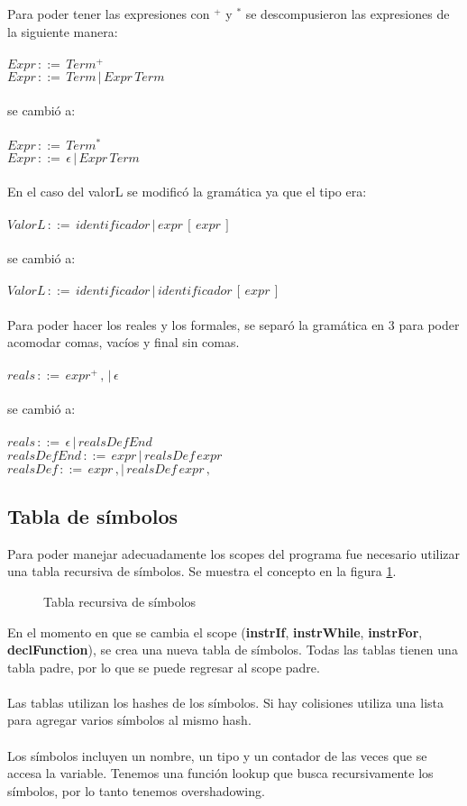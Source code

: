 \documentclass[11pt]{article}
\begin{document}
Para poder tener las expresiones con $^+$ y $^*$ se descompusieron las expresiones de la siguiente manera:
\\\\
$Expr\,::=\,Term^+$
\\
$Expr\,::=\,Term\,|\,Expr\,Term$
\\\\
se cambió a:
\\\\
$Expr\,::=\,Term^*$
\\
$Expr\,::=\,\epsilon\,|\,Expr\,Term$
\\\\
En el caso del valorL se modificó la gramática ya que el tipo era:
\\\\
$ValorL\,::=\,identificador\,|\,expr\,[\,expr\,]$
\\\\
se cambió a:
\\\\
$ValorL\,::=\,identificador\,|\,identificador\,[\,expr\,]$
\\\\
Para poder hacer los reales y los formales, se separó la gramática en 3 para poder acomodar comas, vacíos y final sin comas.
\\\\
$reals\,::=\,expr^+\,,\,|\,\epsilon$
\\\\
se cambió a:
\\\\
$reals\,::=\,\epsilon\,|\,realsDefEnd$
\\
$realsDefEnd\,::=\,expr\,|\,realsDef\,expr$
\\
$realsDef\,::=\,expr\,,|\,realsDef\,expr\,,$

\subsection{Tabla de símbolos}

Para poder manejar adecuadamente los scopes del programa fue necesario utilizar una tabla recursiva de símbolos. Se muestra el 
concepto en la figura \ref{fig:symtabrec}.

\begin{figure}[H]
    \centering
    \caption{Tabla recursiva de símbolos}
    \label{fig:symtabrec}
\end{figure}

En el momento en que se cambia el scope (\textbf{instrIf}, \textbf{instrWhile}, \textbf{instrFor}, \textbf{declFunction}), se 
crea una nueva tabla de símbolos. Todas las tablas tienen una tabla padre, por lo que se puede regresar al scope padre.
\\\\
Las tablas utilizan los hashes de los símbolos. Si hay colisiones utiliza una lista para agregar varios símbolos al mismo hash.
\\\\
Los símbolos incluyen un nombre, un tipo y un contador de las veces que se accesa la variable. Tenemos una función lookup que 
busca recursivamente los símbolos, por lo tanto tenemos overshadowing.
\end{document}
